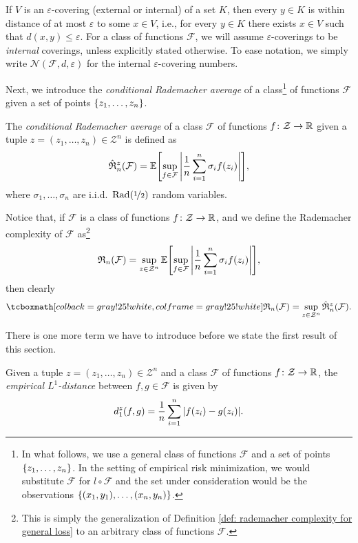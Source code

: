 If $V$ is an $\varepsilon$-covering (external or internal) of a set $K$, then every $y \in K$ is within distance of at most $\varepsilon$ to some $x \in V$, i.e., for every $y \in K$ there exists $x \in V$ such that $d(x, y) \leq \varepsilon$. For a class of functions $\mathcal{F}$, we will assume $\varepsilon$-coverings to be \emph{internal} coverings, unless explicitly stated otherwise. To ease notation, we simply write $\mathcal{N}(\mathcal{F}, d, \varepsilon)$ for the internal $\varepsilon$-covering numbers.

Next, we introduce the \emph{conditional Rademacher average} of a class\footnote{In what follows, we use a general class of functions $\mathcal{F}$ and a set of points $\set{z_1, \dots, z_n}$. In the setting of empirical risk minimization, we would substitute $\mathcal{F}$ for $l \circ \mathcal{F}$ and the set under consideration would be the observations $\set{(x_1, y_1), \dots, (x_n, y_n)}$.} of functions $\mathcal{F}$ given a set of points $\set{z_1, \dots, z_n}$.

\begin{definition}
The \emph{conditional Rademacher average} of a class $\mathcal{F}$ of functions $f \colon \mathcal{Z} \to \mathbb{R}$ given a tuple $z = (z_1, \dots, z_n) \in \mathcal{Z}^n$ is defined as
\[
    \hat{\mathfrak{R}}_n^z(\mathcal{F}) = \Exp\left[\sup_{f \in \mathcal{F}} \abs{\frac{1}{n} \sum_{i=1}^n \sigma_i f(z_i)}\right],
\]
where $\sigma_1, \dots, \sigma_n$ are i.i.d.\ $\operatorname{Rad}(\nicefrac{1}{2})$ random variables.
\end{definition}

Notice that, if $\mathcal{F}$ is a class of functions $f \colon \mathcal{Z} \to \mathbb{R}$, and we define the Rademacher complexity of $\mathcal{F}$ as\footnote{This is simply the generalization of Definition \ref{def: rademacher complexity for general loss} to an arbitrary class of functions $\mathcal{F}$.}
\[
    \mathfrak{R}_n(\mathcal{F}) = \sup_{z \in \mathcal{Z}^n} \Exp\left[\sup_{f \in \mathcal{F}} \abs{\frac{1}{n} \sum_{i=1}^n \sigma_i f(z_i)}\right],
\]
then clearly
\begin{equation}
\label{eq: rademacher complexity and conditional rademacher average}
    \highlightMath{
        \mathfrak{R}_n(\mathcal{F}) = \sup_{z \in \mathcal{Z}^n} \hat{\mathfrak{R}}_n^z(\mathcal{F}).
    }
\end{equation}

There is one more term we have to introduce before we state the first result of this section.

\begin{definition}
Given a tuple $z = (z_1, \dots, z_n) \in \mathcal{Z}^n$ and a class $\mathcal{F}$ of functions $f \colon \mathcal{Z} \to \mathbb{R}$, the \emph{empirical $L^1$-distance} between $f, g \in \mathcal{F}$ is given by
\[
    d_1^z(f, g) = \frac{1}{n} \sum_{i=1}^n \abs{f(z_i) - g(z_i)}.
\]
\end{definition}

